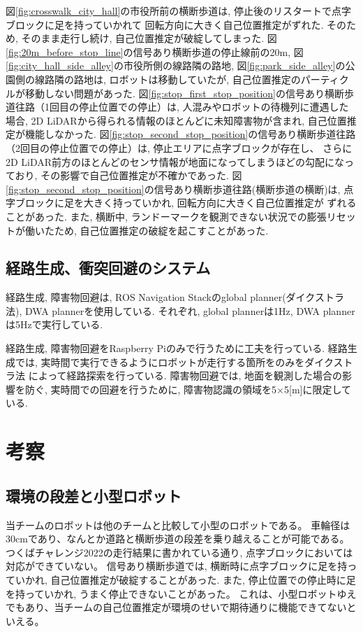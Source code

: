 \documentclass[twocolumn,9pt]{jsproceedings}
\begin{document}
図\ref{fig:crosswalk_city_hall}の市役所前の横断歩道は, 停止後のリスタートで点字ブロックに足を持っていかれて
回転方向に大きく自己位置推定がずれた. そのため, そのまま走行し続け, 自己位置推定が破綻してしまった. 
図\ref{fig:20m_before_stop_line}の信号あり横断歩道の停止線前の20m, 
図\ref{fig:city_hall_side_alley}の市役所側の線路隣の路地, 図\ref{fig:park_side_alley}の公園側の線路隣の路地は, 
ロボットは移動していたが, 自己位置推定のパーティクルが移動しない問題があった. 
図\ref{fig:stop_first_stop_position}の信号あり横断歩道往路（1回目の停止位置での停止）は, 人混みやロボットの待機列に遭遇した
場合, 2D LiDARから得られる情報のほとんどに未知障害物が含まれ, 自己位置推定が機能しなかった. 
図\ref{fig:stop_second_stop_position}の信号あり横断歩道往路（2回目の停止位置での停止）は, 停止エリアに点字ブロックが存在し、
さらに2D LiDAR前方のほとんどのセンサ情報が地面になってしまうほどの勾配になっており, 
その影響で自己位置推定が不確かであった.
図\ref{fig:stop_second_stop_position}の信号あり横断歩道往路(横断歩道の横断)は, 点字ブロックに足を大きく持っていかれ, 回転方向に大きく自己位置推定が
ずれることがあった. 
また, 横断中, ランドーマークを観測できない状況での膨張リセットが働いたため, 自己位置推定の破綻を起こすことがあった. 

\subsection{経路生成、衝突回避のシステム}

経路生成, 障害物回避は, ROS Navigation Stackのglobal planner(ダイクストラ法), DWA plannerを使用している. 
それぞれ, global plannerは1Hz, DWA plannerは5Hzで実行している. 

経路生成, 障害物回避をRaspberry Piのみで行うために工夫を行っている. 
経路生成では, 実時間で実行できるようにロボットが走行する箇所をのみをダイクストラ法
によって経路探索を行っている. 障害物回避では, 地面を観測した場合の影響を防ぐ, 実時間での回避を行うために, 
障害物認識の領域を5×5[m]に限定している. 

\section{考察}

\subsection{環境の段差と小型ロボット}

当チームのロボットは他のチームと比較して小型のロボットである。
車輪径は30cmであり、なんとか道路と横断歩道の段差を乗り越えることが可能である。
つくばチャレンジ2022の走行結果に書かれている通り, 点字ブロックにおいては対応ができていない。
信号あり横断歩道では, 横断時に点字ブロックに足を持っていかれ, 自己位置推定が破綻することがあった.
また, 停止位置での停止時に足を持っていかれ, うまく停止できないことがあった。
これは、小型ロボットゆえでもあり、当チームの自己位置推定が環境のせいで期待通りに機能できてないといえる。
\end{document}
